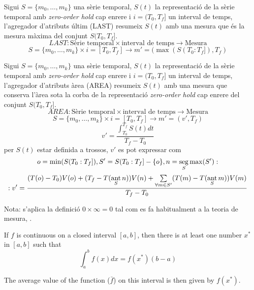 \begin{definition}
  Sigui $S=\{m_0,\ldots,m_k\}$ una sèrie temporal, $S(t)$ la
  representació de la sèrie temporal amb \emph{zero-order hold} cap
  enrere i $i=(T_0,T_f]$ un interval de temps, l'agregador d'atributs últim
  (LAST) resumeix $S(t)$ amb una mesura que és la mesura màxima del
  conjunt $S(T_0,T_f]$.
\[
LAST: \text{Sèrie temporal} \times \text{interval de temps} \longrightarrow \text{Mesura}
\]
\[
S=\{m_0,\ldots,m_k\} \times i=[T_0,T_f]  \longrightarrow m'=(\max(S(T_0:T_f]),T_f)
\]
\end{definition}



\begin{definition}
  Sigui $S=\{m_0,\ldots,m_k\}$ una sèrie temporal, $S(t)$ la
  representació de la sèrie temporal amb \emph{zero-order hold} cap
  enrere i $i=(T_0,T_f]$ un interval de temps, l'agregador d'atributs àrea
  (AREA) resumeix $S(t)$ amb una mesura que conserva l'àrea sota la
  corba de la representació \emph{zero-order hold} cap enrere del
  conjunt $S(T_0,T_f]$.
\[
AREA: \text{Sèrie temporal} \times \text{interval de temps} \longrightarrow \text{Mesura}
\]
\[
S=\{m_0,\ldots,m_k\} \times i=[T_0,T_f]  \longrightarrow m'=(v',T_f)
\]
\[
v' = 
\frac{\int_{T_0}^{T_f} S(t) dt}{T_f - T_0}
\]
per $S(t)$ estar definida a trossos, $v'$ es pot expressar com
\[
o=\min(S(T_0:T_f]),
S'= S(T_0:T_f] - \{o\},
n=\seg\limits_S \max(S'): %
\]
\[
:v'= \frac{(T(o)-T_0)V(o) 
+( T_f- T(\operatorname*{ant}\limits_S n) )V(n) 
+\sum\limits_{\forall m \in S'}( T(m)- T(\operatorname*{ant}\limits_S m) )V(m)}
{T_f-T_0} 
\]

Nota: s'aplica la definició $0 \times \infty = 0$ tal com es fa habitualment a la teoria de mesura, \cite{wiki:extendedreal}.
\end{definition}



If $f$ is continuous on a closed interval $[a,b]$, then there is at least one number $x^*$ in $[a,b]$ such that
$$
\int_a^b f(x)dx = f(x^*)(b-a)
$$

The average value of the function ($\bar f$)  on this interval is then given by  $f(x^*)$.

